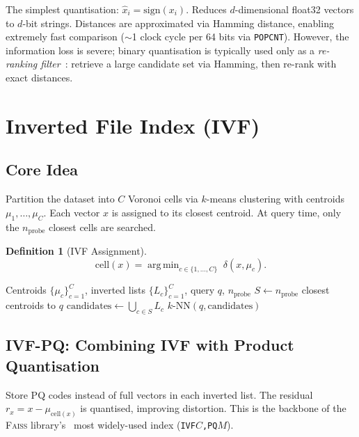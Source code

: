 \documentclass[11pt,a4paper]{article}
\theoremstyle{definition}
\newtheorem{definition}{Definition}[section]
\newcommand{\argmin}{\operatorname{arg\,min}}
\begin{document}
The simplest quantisation: $\hat{x}_i = \mathrm{sign}(x_i)$.  Reduces
$d$-dimensional float32 vectors to $d$-bit strings.  Distances are
approximated via Hamming distance, enabling extremely fast comparison
($\sim$1 clock cycle per 64 bits via \texttt{POPCNT}).  However,
the information loss is severe; binary quantisation is typically used
only as a \emph{re-ranking filter}~\cite{aguerrebere2024similarity}: retrieve a large candidate set via
Hamming, then re-rank with exact distances.


\section{Inverted File Index (IVF)}\label{sec:ivf}

\subsection{Core Idea}

Partition the dataset into $C$ Voronoi cells via $k$-means clustering
with centroids $\mu_1, \ldots, \mu_C$.  Each vector $x$ is assigned to
its closest centroid.  At query time, only the $n_{\text{probe}}$ closest
cells are searched.

\begin{definition}[IVF Assignment]
\[
  \mathrm{cell}(x) = \argmin_{c \in \{1,\ldots,C\}}\; \delta(x, \mu_c).
\]
\end{definition}

\begin{algorithm}[H]
\caption{IVF Search}
\begin{algorithmic}[1]
\Require Centroids $\{\mu_c\}_{c=1}^C$, inverted lists $\{L_c\}_{c=1}^C$, query $q$, $n_{\mathrm{probe}}$
\State $S \gets n_{\mathrm{probe}}$ closest centroids to $q$
\State $\mathrm{candidates} \gets \bigcup_{c \in S} L_c$
\State \Return $k\text{-NN}(q, \mathrm{candidates})$
\end{algorithmic}
\end{algorithm}

\subsection{IVF-PQ: Combining IVF with Product Quantisation}

Store PQ codes instead of full vectors in each inverted list.  The
residual $r_x = x - \mu_{\mathrm{cell}(x)}$ is quantised, improving
distortion.  This is the backbone of the \textsc{Faiss} library's~\cite{johnson2019faiss} most
widely-used index (\texttt{IVF$C$,PQ$M$}).
\end{document}
